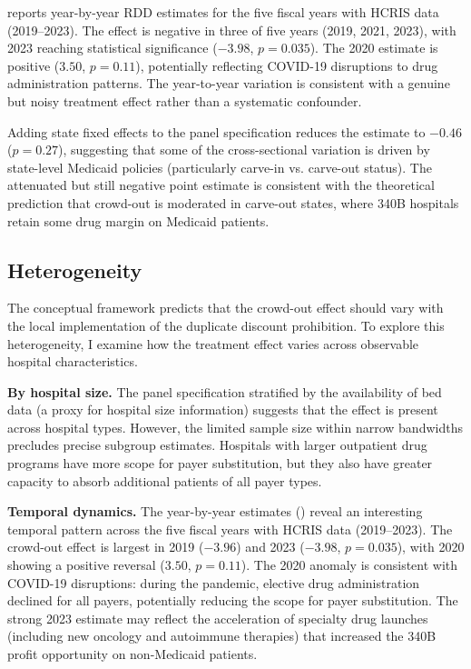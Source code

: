 \documentclass[12pt]{article}
\begin{document}
 reports year-by-year RDD estimates for the five fiscal years with HCRIS data (2019--2023). The effect is negative in three of five years (2019, 2021, 2023), with 2023 reaching statistical significance ($-3.98$, $p = 0.035$). The 2020 estimate is positive ($3.50$, $p = 0.11$), potentially reflecting COVID-19 disruptions to drug administration patterns. The year-to-year variation is consistent with a genuine but noisy treatment effect rather than a systematic confounder.

Adding state fixed effects to the panel specification reduces the estimate to $-0.46$ ($p = 0.27$), suggesting that some of the cross-sectional variation is driven by state-level Medicaid policies (particularly carve-in vs. carve-out status). The attenuated but still negative point estimate is consistent with the theoretical prediction that crowd-out is moderated in carve-out states, where 340B hospitals retain some drug margin on Medicaid patients.


\subsection{Heterogeneity}

The conceptual framework predicts that the crowd-out effect should vary with the local implementation of the duplicate discount prohibition. To explore this heterogeneity, I examine how the treatment effect varies across observable hospital characteristics.

\textbf{By hospital size.} The panel specification stratified by the availability of bed data (a proxy for hospital size information) suggests that the effect is present across hospital types. However, the limited sample size within narrow bandwidths precludes precise subgroup estimates. Hospitals with larger outpatient drug programs have more scope for payer substitution, but they also have greater capacity to absorb additional patients of all payer types.

\textbf{Temporal dynamics.} The year-by-year estimates () reveal an interesting temporal pattern across the five fiscal years with HCRIS data (2019--2023). The crowd-out effect is largest in 2019 ($-3.96$) and 2023 ($-3.98$, $p=0.035$), with 2020 showing a positive reversal ($3.50$, $p=0.11$). The 2020 anomaly is consistent with COVID-19 disruptions: during the pandemic, elective drug administration declined for all payers, potentially reducing the scope for payer substitution. The strong 2023 estimate may reflect the acceleration of specialty drug launches (including new oncology and autoimmune therapies) that increased the 340B profit opportunity on non-Medicaid patients.
\end{document}
